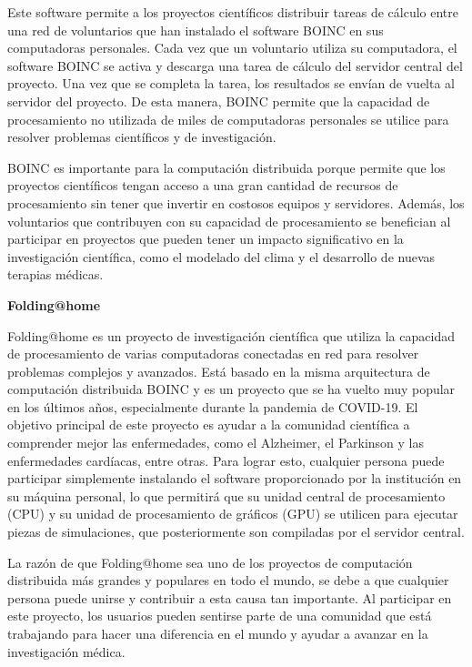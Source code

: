 \begin{spacing}{1.5}
  Este software permite a los proyectos científicos distribuir tareas de cálculo entre una red de voluntarios que han instalado el software BOINC en sus computadoras personales. Cada vez que un voluntario utiliza su computadora, el software BOINC se activa y descarga una tarea de cálculo del servidor central del proyecto. Una vez que se completa la tarea, los resultados se envían de vuelta al servidor del proyecto. De esta manera, BOINC permite que la capacidad de procesamiento no utilizada de miles de computadoras personales se utilice para resolver problemas científicos y de investigación.

  BOINC es importante para la computación distribuida porque permite que los proyectos científicos tengan acceso a una gran cantidad de recursos de procesamiento sin tener que invertir en costosos equipos y servidores. Además, los voluntarios que contribuyen con su capacidad de procesamiento se benefician al participar en proyectos que pueden tener un impacto significativo en la investigación científica, como el modelado del clima y el desarrollo de nuevas terapias médicas. \cite{BOINC-1}

  \textbf{Folding@home}

  Folding@home es un proyecto de investigación científica que utiliza la capacidad de procesamiento de varias computadoras conectadas en red para resolver problemas complejos y avanzados. Está basado en la misma arquitectura de computación distribuida BOINC y es un proyecto que se ha vuelto muy popular en los últimos años, especialmente durante la pandemia de COVID-19. El objetivo principal de este proyecto es ayudar a la comunidad científica a comprender mejor las enfermedades, como el Alzheimer, el Parkinson y las enfermedades cardíacas, entre otras. Para lograr esto, cualquier persona puede participar simplemente instalando el software proporcionado por la institución en su máquina personal, lo que permitirá que su unidad central de procesamiento (CPU) y su unidad de procesamiento de gráficos (GPU) se utilicen para ejecutar piezas de simulaciones, que posteriormente son compiladas por el servidor central.

  La razón de que Folding@home sea uno de los proyectos de computación distribuida más grandes y populares en todo el mundo, se debe a que cualquier persona puede unirse y contribuir a esta causa tan importante. Al participar en este proyecto, los usuarios pueden sentirse parte de una comunidad que está trabajando para hacer una diferencia en el mundo y ayudar a avanzar en la investigación médica.


\end{spacing}
